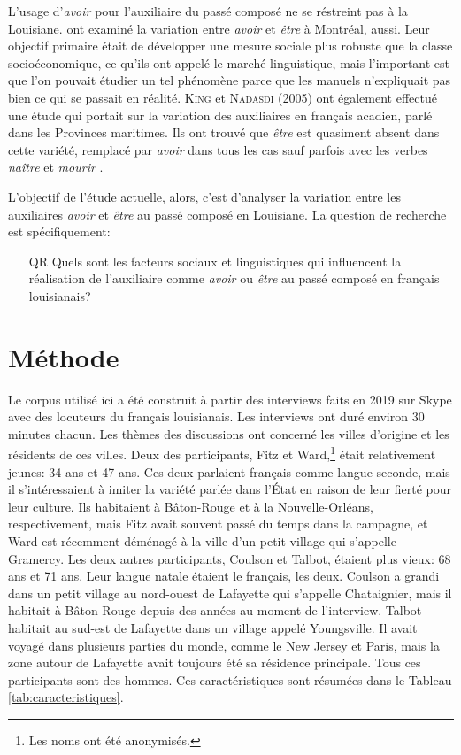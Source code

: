 \documentclass{article}
\newcommand{\lexi}[1]{\textit{#1}}
\newcommand{\name}[1]{\textsc{#1}}
\begin{document}
    L'usage d'\lexi{avoir} pour l'auxiliaire du passé composé ne se réstreint pas à la Louisiane.
    \textcite{sankoff_linguistic_1978} ont examiné la variation entre \lexi{avoir} et \lexi{être} à Montréal, aussi.
    Leur objectif primaire était de développer une mesure sociale plus robuste que la classe socioéconomique, ce qu'ils ont appelé le marché linguistique, mais l'important est que l'on pouvait étudier un tel phénomène parce que les manuels n'expliquait pas bien ce qui se passait en réalité.
    \name{King} et \name{Nadasdi} (2005) ont également effectué une étude qui portait sur la variation des auxiliaires en français acadien, parlé dans les Provinces maritimes.
    Ils ont trouvé que \lexi{être} est quasiment absent dans cette variété, remplacé par \lexi{avoir} dans tous les cas sauf parfois avec les verbes \lexi{naître} et \lexi{mourir} \parencite[\name{King} et \name{Nadasdi}, 2005, cité dans][p.~325]{comeau_new_2012}.

    L'objectif de l'étude actuelle, alors, c'est d'analyser la variation entre les auxiliaires \lexi{avoir} et \lexi{être} au passé composé en Louisiane.
    La question de recherche est spécifiquement:

    \begin{itemize}
      \item[QR] Quels sont les facteurs sociaux et linguistiques qui influencent la réalisation de l'auxiliaire comme \lexi{avoir} ou \lexi{être} au passé composé en français louisianais?
    \end{itemize}

  \section{Méthode}
    \label{sec:méthode}
    Le corpus utilisé ici a été construit à partir des interviews faits en 2019 sur Skype avec des locuteurs du français louisianais.
    Les interviews ont duré environ 30 minutes chacun.
    Les thèmes des discussions ont concerné les villes d'origine et les résidents de ces villes.
    Deux des participants, Fitz et Ward,\footnote{Les noms ont été anonymisés.} était relativement jeunes: 34 ans et 47 ans.
    Ces deux parlaient français comme langue seconde, mais il s'intéressaient à imiter la variété parlée dans l'État en raison de leur fierté pour leur culture.
    Ils habitaient à Bâton-Rouge et à la Nouvelle-Orléans, respectivement, mais Fitz avait souvent passé du temps dans la campagne, et Ward est récemment déménagé à la ville d'un petit village qui s'appelle Gramercy.
    Les deux autres participants, Coulson et Talbot, étaient plus vieux: 68 ans et 71 ans.
    Leur langue natale étaient le français, les deux.
    Coulson a grandi dans un petit village au nord-ouest de Lafayette qui s'appelle Chataignier, mais il habitait à Bâton-Rouge depuis des années au moment de l'interview.
    Talbot habitait au sud-est de Lafayette dans un village appelé Youngsville.
    Il avait voyagé dans plusieurs parties du monde, comme le New Jersey et Paris, mais la zone autour de Lafayette avait toujours été sa résidence principale.
    Tous ces participants sont des hommes.
    Ces caractéristiques sont résumées dans le Tableau \ref{tab:caracteristiques}.
\end{document}
